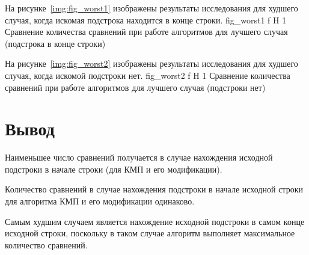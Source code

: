 На рисунке~\ref{img:fig_worst1} изображены результаты исследования для худшего случая, когда искомая подстрока находится в конце строки.
{fig_worst1}
{f}
{H}
{1\textwidth}
{Сравнение количества сравнений при работе алгоритмов для лучшего случая (подстрока в конце строки)}

На рисунке~\ref{img:fig_worst2} изображены результаты исследования для худшего случая, когда искомой подстроки нет.
{fig_worst2}
{f}
{H}
{1\textwidth}
{Сравнение количества сравнений при работе алгоритмов для лучшего случая (подстроки нет)}

\section*{Вывод}
Наименьшее число сравнений получается в случае нахождения исходной подстроки в начале строки (для КМП и его модификации).

Количество сравнений в случае нахождения подстроки в начале исходной строки для алгоритма КМП и его модификации одинаково.

Самым худшим случаем является нахождение исходной подстроки в самом конце исходной строки, поскольку в таком случае алгоритм выполняет максимальное количество сравнений.


